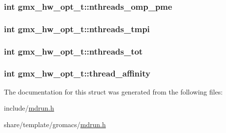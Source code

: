 \hypertarget{structgmx__hw__opt__t_aaa1c49e7208c79b725eaac36f8763bfc}{
\subsubsection[{nthreads\-\_\-omp\-\_\-pme}]{\setlength{\rightskip}{0pt plus 5cm}int {\bf gmx\-\_\-hw\-\_\-opt\-\_\-t\-::nthreads\-\_\-omp\-\_\-pme}}}\label{structgmx__hw__opt__t_aaa1c49e7208c79b725eaac36f8763bfc}
\hypertarget{structgmx__hw__opt__t_a538054af51935efb5b1e581d35c20125}{
\subsubsection[{nthreads\-\_\-tmpi}]{\setlength{\rightskip}{0pt plus 5cm}int {\bf gmx\-\_\-hw\-\_\-opt\-\_\-t\-::nthreads\-\_\-tmpi}}}\label{structgmx__hw__opt__t_a538054af51935efb5b1e581d35c20125}
\hypertarget{structgmx__hw__opt__t_aff4425b9aac9317a33116944d9950a28}{
\subsubsection[{nthreads\-\_\-tot}]{\setlength{\rightskip}{0pt plus 5cm}int {\bf gmx\-\_\-hw\-\_\-opt\-\_\-t\-::nthreads\-\_\-tot}}}\label{structgmx__hw__opt__t_aff4425b9aac9317a33116944d9950a28}
\hypertarget{structgmx__hw__opt__t_a5785a3020079b5be75c62405e03cb1e2}{
\subsubsection[{thread\-\_\-affinity}]{\setlength{\rightskip}{0pt plus 5cm}int {\bf gmx\-\_\-hw\-\_\-opt\-\_\-t\-::thread\-\_\-affinity}}}\label{structgmx__hw__opt__t_a5785a3020079b5be75c62405e03cb1e2}


\-The documentation for this struct was generated from the following files\-:\begin{DoxyCompactItemize}
\item 
include/\hyperlink{include_2mdrun_8h}{mdrun.\-h}\item 
share/template/gromacs/\hyperlink{share_2template_2gromacs_2mdrun_8h}{mdrun.\-h}\end{DoxyCompactItemize}
